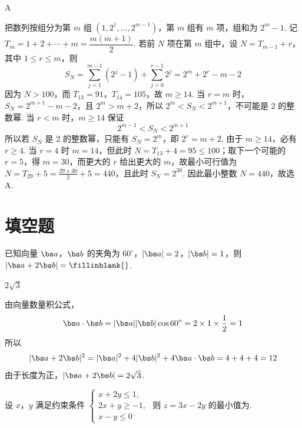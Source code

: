 \begin{answer}
A
\end{answer}

\begin{solution}
把数列按组分为第 \(m\) 组 \((1,2^1,\ldots,2^{m-1})\)，第 \(m\) 组有 \(m\) 项，组和为 \(2^m-1\). 记 \(T_m=1+2+\cdots+m=\dfrac{m(m+1)}2\). 若前 \(N\) 项在第 \(m\) 组中，设 \(N=T_{m-1}+r\)，其中 \(1\le r\le m\)，则
\[
S_N=\sum_{j=1}^{m-1}(2^j-1)+\sum_{j=0}^{r-1}2^j
=2^m+2^r-m-2
\]
因为 \(N>100\)，而 \(T_{13}=91\)，\(T_{14}=105\)，故 \(m\ge14\). 当 \(r=m\) 时，\(S_N=2^{m+1}-m-2\)，且 \(2^m>m+2\)，所以 \(2^m<S_N<2^{m+1}\)，不可能是 \(2\) 的整数幂. 当 \(r<m\) 时，\(m\ge14\) 保证
\[
2^{m-1}<S_N<2^{m+1}
\]
所以若 \(S_N\) 是 \(2\) 的整数幂，只能有 \(S_N=2^m\)，即 \(2^r=m+2\). 由于 \(m\ge14\)，必有 \(r\ge4\). 当 \(r=4\) 时 \(m=14\)，但此时 \(N=T_{13}+4=95\le100\)；取下一个可能的 \(r=5\)，得 \(m=30\)，而更大的 \(r\) 给出更大的 \(m\)，故最小可行值为
\(N=T_{29}+5=\frac{29\times30}{2}+5=440\)，且此时 \(S_N=2^{30}\).
因此最小整数 \(N=440\)，故选 A.
\end{solution}

\section{填空题}

\begin{problem}
已知向量 \(\bs a\)，\(\bs b\) 的夹角为 \(60^\circ\)，\(\lvert\bs a\rvert=2\)，\(\lvert\bs b\rvert=1\)，则 \(\lvert\bs a+2\bs b\rvert=\fillinblank{}\).
\end{problem}

\begin{answer}
\(2\sqrt3\)
\end{answer}

\begin{solution}
由向量数量积公式，
\[
\bs a\cdot\bs b=\lvert\bs a\rvert\lvert\bs b\rvert\cos60^\circ=2\times1\times\frac12=1
\]
所以
\[
\lvert\bs a+2\bs b\rvert^2
=\lvert\bs a\rvert^2+4\lvert\bs b\rvert^2+4\bs a\cdot\bs b
=4+4+4=12
\]
由于长度为正，\(\lvert\bs a+2\bs b\rvert=2\sqrt3\).
\end{solution}

\begin{problem}
设 \(x\)，\(y\) 满足约束条件
\(\begin{cases}
x+2y\le1,\\
2x+y\ge-1,\\
x-y\le0
\end{cases}\)
则 \(z=3x-2y\) 的最小值为\fillinblank{}.
\end{problem}

